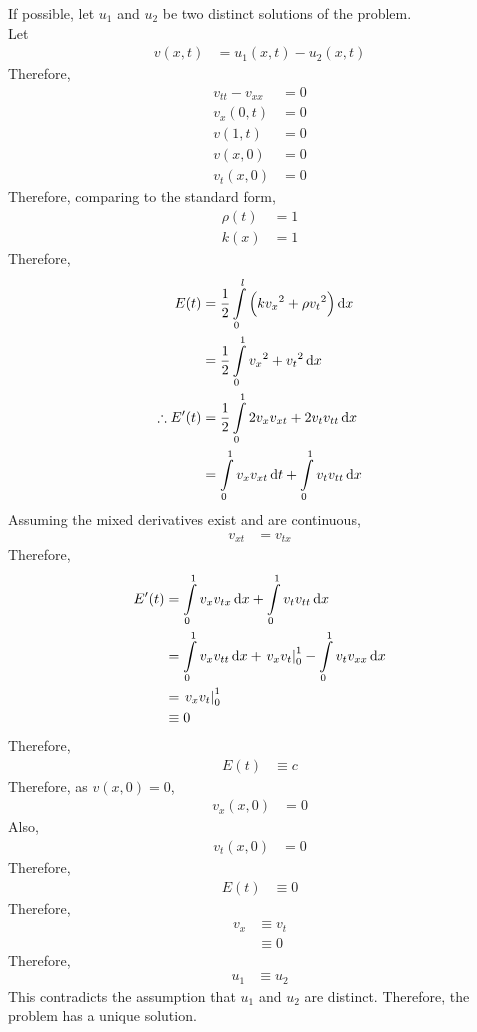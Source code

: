 \documentclass[fleqn, a4paper, 11pt, oneside]{amsart}
\theoremstyle{definition}
\theoremstyle{theorem}
\begin{document}
\begin{solution}
	If possible, let $u_1$ and $u_2$ be two distinct solutions of the problem.\\
	Let
	\begin{align*}
		v(x,t) &= u_1(x,t) - u_2(x,t)
	\end{align*}
	Therefore,
	\begin{align*}
		v_{t t} - v_{x x} &= 0\\
		v_x(0,t) &= 0\\
		v(1,t) &= 0\\
		v(x,0) &= 0\\
		v_t(x,0) &= 0
	\end{align*}
	Therefore, comparing to the standard form,
	\begin{align*}
		\rho(t) &= 1\\
		k(x) &= 1
	\end{align*}
	Therefore,
	\begin{align*}
		E(t) &= \frac{1}{2} \int\limits_{0}^{l} \left( k {v_x}^2 + \rho {v_t}^2 \right) \dif x\\
		&= \frac{1}{2} \int\limits_{0}^{1} {v_x}^2 + {v_t}^2 \dif x\\
		\therefore E'(t) &= \frac{1}{2} \int\limits_{0}^{1} 2 v_x v_{x t} + 2 v_t v_{t t} \dif x\\
		&= \int\limits_{0}^{1} v_x v_{x t} \dif t + \int\limits_{0}^{1} v_t v_{t t} \dif x
	\end{align*}
	Assuming the mixed derivatives exist and are continuous,
	\begin{align*}
		v_{x t} &= v_{t x}
	\end{align*}
	Therefore,
	\begin{align*}
		E'(t) &= \int\limits_{0}^{1} v_x v_{t x} \dif x + \int\limits_{0}^{1} v_t v_{t t} \dif x\\
		&= \int\limits_{0}^{1} v_x v_{t t} \dif x + \left. v_x v_t \right|_{0}^{1} - \int\limits_{0}^{1} v_t v_{x x} \dif x\\
		&= \left. v_x v_t \right|_{0}^{1}\\
		&\equiv 0
	\end{align*}
	Therefore,
	\begin{align*}
		E(t) &\equiv c
	\end{align*}
	Therefore, as $v(x,0) = 0$,
	\begin{align*}
		v_x(x,0) &= 0
	\end{align*}
	Also,
	\begin{align*}
		v_t(x,0) &= 0
	\end{align*}
	Therefore,
	\begin{align*}
		E(t) &\equiv 0
	\end{align*}
	Therefore,
	\begin{align*}
		v_x &\equiv v_t\\
		&\equiv 0
	\end{align*}
	Therefore,
	\begin{align*}
		u_1 &\equiv u_2
	\end{align*}
	This contradicts the assumption that $u_1$ and $u_2$ are distinct.
	Therefore, the problem has a unique solution.
\end{solution}
\end{document}
